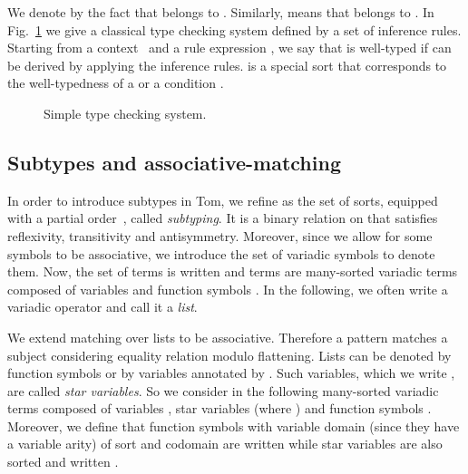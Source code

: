 \documentclass{eptcs}
\newcommand{\tom}{\textsf{Tom}\xspace}
\begin{document}
We denote by 
the fact that 
 belongs to .
Similarly,
 means that 
belongs to .
In Fig.~\ref{fig:simplechecking} we give a classical type checking system defined by a set of inference rules.
Starting from a context~ and a rule expression , we say that 
is well-typed if  can be derived by applying the inference rules. 
is a special sort that corresponds to the well-typedness of a  or a
condition .

\begin{figure}[h!]

\caption{Simple type checking system.}
\label{fig:simplechecking}
\end{figure}

\subsection{Subtypes and associative-matching}
\label{subsec:subtypes}

In order to introduce subtypes in \tom, we refine  as the set of sorts, equipped
with a partial order~, called {\em subtyping}. It is a binary relation on 
that satisfies reflexivity, transitivity and antisymmetry. Moreover, since we allow for
some symbols to be associative, we introduce the set  of variadic symbols to
denote them.  Now, the set of terms is written  and terms are many-sorted variadic
terms composed of variables  and function symbols . In the
following, we often write  a variadic operator and call it a {\em list}.

We extend matching over lists to be associative. Therefore a pattern matches a subject
considering equality relation modulo flattening. Lists can be denoted by function symbols
 or by variables  annotated by . Such variables, which we
write , are called {\em star variables}. So we consider in the following many-sorted
variadic terms composed of variables , star variables  (where )
and function symbols . Moreover, we define that function symbols  with variable domain (since they have a variable arity) of sort  and
codomain  are written  while star variables  are also sorted
and written .
\end{document}
